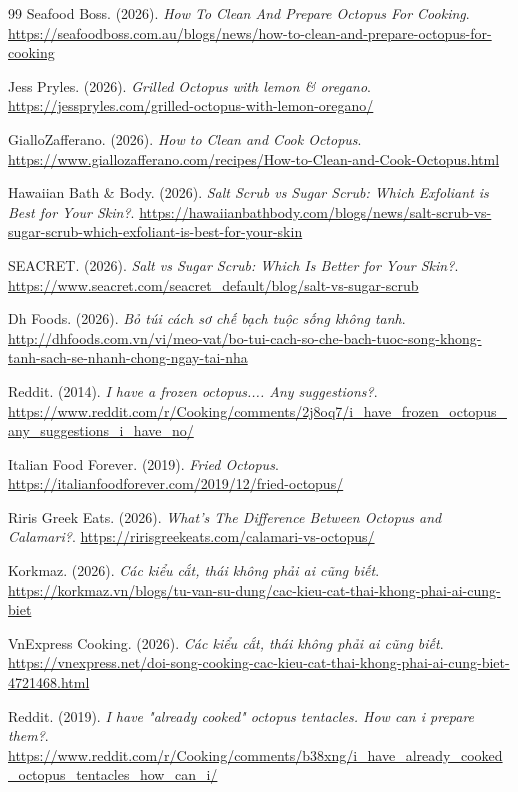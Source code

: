 \documentclass[12pt,a4paper]{report}
\begin{document}
\begin{thebibliography}{99}
 Seafood Boss. (2026). \textit{How To Clean And Prepare Octopus For Cooking}. \url{https://seafoodboss.com.au/blogs/news/how-to-clean-and-prepare-octopus-for-cooking}

 Jess Pryles. (2026). \textit{Grilled Octopus with lemon \& oregano}. \url{https://jesspryles.com/grilled-octopus-with-lemon-oregano/}

 GialloZafferano. (2026). \textit{How to Clean and Cook Octopus}. \url{https://www.giallozafferano.com/recipes/How-to-Clean-and-Cook-Octopus.html}

 Hawaiian Bath \& Body. (2026). \textit{Salt Scrub vs Sugar Scrub: Which Exfoliant is Best for Your Skin?}. \url{https://hawaiianbathbody.com/blogs/news/salt-scrub-vs-sugar-scrub-which-exfoliant-is-best-for-your-skin}

 SEACRET. (2026). \textit{Salt vs Sugar Scrub: Which Is Better for Your Skin?}. \url{https://www.seacret.com/seacret_default/blog/salt-vs-sugar-scrub}

 Dh Foods. (2026). \textit{Bỏ túi cách sơ chế bạch tuộc sống không tanh}. \url{http://dhfoods.com.vn/vi/meo-vat/bo-tui-cach-so-che-bach-tuoc-song-khong-tanh-sach-se-nhanh-chong-ngay-tai-nha}

 Reddit. (2014). \textit{I have a frozen octopus.... Any suggestions?}. \url{https://www.reddit.com/r/Cooking/comments/2j8oq7/i_have_frozen_octopus_any_suggestions_i_have_no/}

 Italian Food Forever. (2019). \textit{Fried Octopus}. \url{https://italianfoodforever.com/2019/12/fried-octopus/}

 Riris Greek Eats. (2026). \textit{What's The Difference Between Octopus and Calamari?}. \url{https://ririsgreekeats.com/calamari-vs-octopus/}

 Korkmaz. (2026). \textit{Các kiểu cắt, thái không phải ai cũng biết}. \url{https://korkmaz.vn/blogs/tu-van-su-dung/cac-kieu-cat-thai-khong-phai-ai-cung-biet}

 VnExpress Cooking. (2026). \textit{Các kiểu cắt, thái không phải ai cũng biết}. \url{https://vnexpress.net/doi-song-cooking-cac-kieu-cat-thai-khong-phai-ai-cung-biet-4721468.html}

 Reddit. (2019). \textit{I have "already cooked" octopus tentacles. How can i prepare them?}. \url{https://www.reddit.com/r/Cooking/comments/b38xng/i_have_already_cooked_octopus_tentacles_how_can_i/}


\end{thebibliography}
\end{document}
